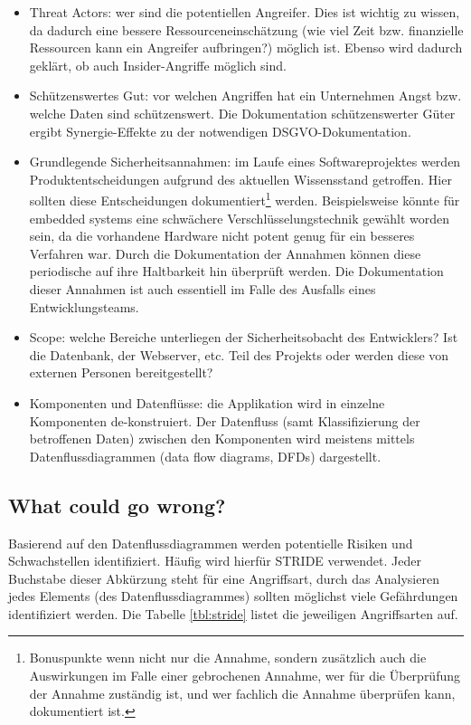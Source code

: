 \begin{itemize}
	\item Threat Actors: wer sind die potentiellen Angreifer. Dies ist wichtig zu wissen, da dadurch eine bessere Ressourceneinschätzung (wie viel Zeit bzw. finanzielle Ressourcen kann ein Angreifer aufbringen?) möglich ist. Ebenso wird dadurch geklärt, ob auch Insider-Angriffe möglich sind.
	\item Schützenswertes Gut: vor welchen Angriffen hat ein Unternehmen Angst bzw. welche Daten sind schützenswert. Die Dokumentation schützenswerter Güter ergibt Synergie-Effekte zu der notwendigen DSGVO-Dokumentation.
	\item Grundlegende Sicherheitsannahmen: im Laufe eines Softwareprojektes werden Produktentscheidungen aufgrund des aktuellen Wissensstand getroffen. Hier sollten diese Entscheidungen dokumentiert\footnote{Bonuspunkte wenn nicht nur die Annahme, sondern zusätzlich auch die Auswirkungen im Falle einer gebrochenen Annahme, wer für die Überprüfung der Annahme zuständig ist, und wer fachlich die Annahme überprüfen kann, dokumentiert ist.} werden. Beispielsweise könnte für embedded systems eine schwächere Verschlüsselungstechnik gewählt worden sein, da die vorhandene Hardware nicht potent genug für ein besseres Verfahren war. Durch die Dokumentation der Annahmen können diese periodische auf ihre Haltbarkeit hin überprüft werden. Die Dokumentation dieser Annahmen ist auch essentiell im Falle des Ausfalls eines Entwicklungsteams.
	\item Scope: welche Bereiche unterliegen der Sicherheitsobacht des Entwicklers? Ist die Datenbank, der Webserver, etc. Teil des Projekts oder werden diese von externen Personen bereitgestellt?
	\item Komponenten und Datenflüsse: die Applikation wird in einzelne Komponenten de-konstruiert. Der Datenfluss (samt Klassifizierung der betroffenen Daten) zwischen den Komponenten wird meistens mittels Datenflussdiagrammen (data flow diagrams, DFDs) dargestellt.
\end{itemize}

\subsection{What could go wrong?}

Basierend auf den Datenflussdiagrammen werden potentielle Risiken und Schwachstellen identifiziert. Häufig wird hierfür STRIDE verwendet. Jeder Buchstabe dieser Abkürzung steht für eine Angriffsart, durch das Analysieren jedes Elements (des Datenflussdiagrammes) sollten möglichst viele Gefährdungen identifiziert werden. Die Tabelle \ref{tbl:stride} listet die jeweiligen Angriffsarten auf.

